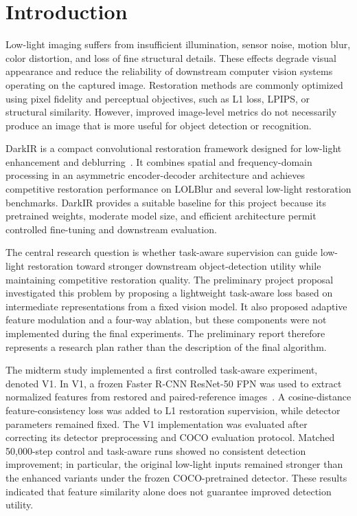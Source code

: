 \section{Introduction}
\label{sec:intro}

Low-light imaging suffers from insufficient illumination, sensor noise,
motion blur, color distortion, and loss of fine structural details.
These effects degrade visual appearance and reduce the reliability of
downstream computer vision systems operating on the captured image.
Restoration methods are commonly optimized using pixel fidelity and
perceptual objectives, such as L1 loss, LPIPS, or structural similarity.
However, improved image-level metrics do not necessarily produce an image
that is more useful for object detection or recognition.

DarkIR is a compact convolutional restoration framework designed for
low-light enhancement and deblurring~\cite{feijoo2025darkir}. It combines
spatial and frequency-domain processing in an asymmetric encoder-decoder
architecture and achieves competitive restoration performance on LOLBlur
and several low-light restoration benchmarks. DarkIR provides a suitable
baseline for this project because its pretrained weights, moderate model
size, and efficient architecture permit controlled fine-tuning and
downstream evaluation.

The central research question is whether task-aware supervision can guide
low-light restoration toward stronger downstream object-detection utility
while maintaining competitive restoration quality. The preliminary project
proposal investigated this problem by proposing a lightweight task-aware
loss based on intermediate representations from a fixed vision model. It
also proposed adaptive feature modulation and a four-way ablation, but these
components were not implemented during the final experiments. The
preliminary report therefore represents a research plan rather than the
description of the final algorithm.

The midterm study implemented a first controlled task-aware experiment,
denoted V1. In V1, a frozen Faster R-CNN ResNet-50 FPN was used to extract
normalized features from restored and paired-reference images~\cite{ren2015fasterrcnn}.
A cosine-distance feature-consistency loss was added to L1 restoration
supervision, while detector parameters remained fixed. The V1
implementation was evaluated after correcting its detector preprocessing
and COCO evaluation protocol. Matched 50,000-step control and task-aware
runs showed no consistent detection improvement; in particular, the
original low-light inputs remained stronger than the enhanced variants
under the frozen COCO-pretrained detector. These results indicated that
feature similarity alone does not guarantee improved detection utility.

